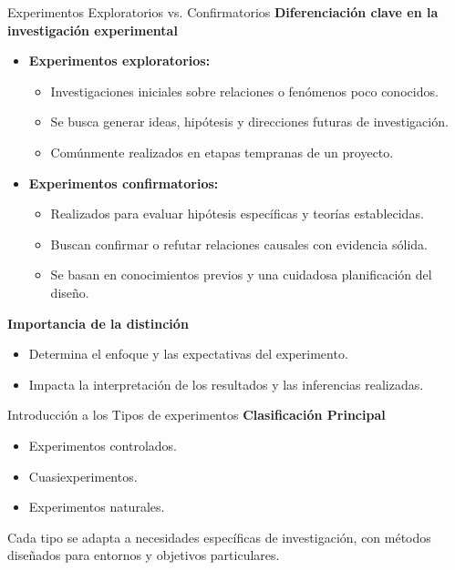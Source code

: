 ﻿\documentclass{beamer}
\begin{document}
\begin{frame}{Experimentos Exploratorios vs. Confirmatorios}
\textbf{Diferenciación clave en la investigación experimental}
\begin{itemize}
    \item \textbf{Experimentos exploratorios:}
    \begin{itemize}
        \item Investigaciones iniciales sobre relaciones o fenómenos poco conocidos.
        \item Se busca generar ideas, hipótesis y direcciones futuras de investigación.
        \item Comúnmente realizados en etapas tempranas de un proyecto.
    \end{itemize}
    \item \textbf{Experimentos confirmatorios:}
    \begin{itemize}
        \item Realizados para evaluar hipótesis específicas y teorías establecidas.
        \item Buscan confirmar o refutar relaciones causales con evidencia sólida.
        \item Se basan en conocimientos previos y una cuidadosa planificación del diseño.
    \end{itemize}
\end{itemize}

\textbf{Importancia de la distinción}
\begin{itemize}
    \item Determina el enfoque y las expectativas del experimento.
    \item Impacta la interpretación de los resultados y las inferencias realizadas.
\end{itemize}
\end{frame}


\begin{frame}{Introducción a los Tipos de experimentos}
    \textbf{Clasificación Principal}
    \begin{itemize}
        \item Experimentos controlados.
        \item Cuasiexperimentos.
        \item Experimentos naturales.
    \end{itemize}
    Cada tipo se adapta a necesidades específicas de investigación, con métodos diseñados para entornos y objetivos particulares.
\end{frame}
\end{document}
